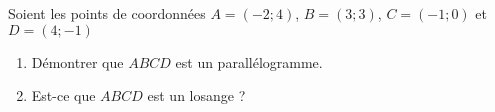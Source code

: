 
\begin{exercice}\label{exosmath-0063}

    Soient les points de coordonnées \( A=(-2;4)\), \( B=(3;3)\), \( C=(-1;0)\) et \( D=(4;-1)\)
    \begin{enumerate}
        \item
            Démontrer que \( ABCD\) est un parallélogramme.
        \item
            Est-ce que \( ABCD\) est un losange ?
    \end{enumerate}

\end{exercice}
